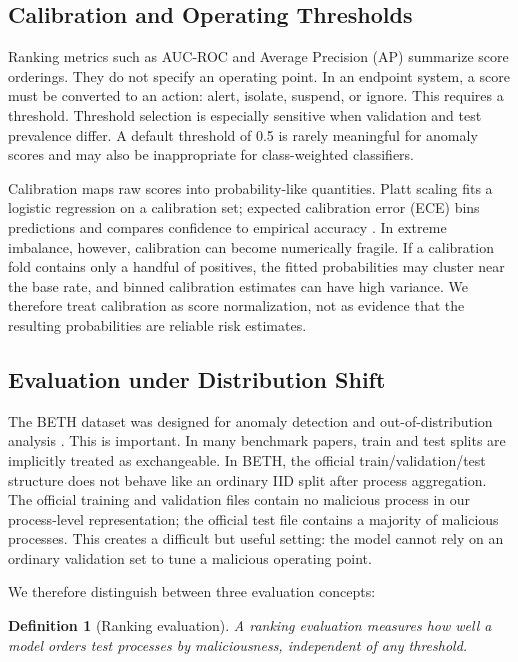 \documentclass[10pt,journal,compsoc]{IEEEtran}
\newtheorem{definition}{Definition}
\begin{document}
\subsection{Calibration and Operating Thresholds}

Ranking metrics such as AUC-ROC and Average Precision (AP) summarize score orderings. They do not specify an operating point. In an endpoint system, a score must be converted to an action: alert, isolate, suspend, or ignore. This requires a threshold. Threshold selection is especially sensitive when validation and test prevalence differ. A default threshold of 0.5 is rarely meaningful for anomaly scores and may also be inappropriate for class-weighted classifiers.

Calibration maps raw scores into probability-like quantities. Platt scaling \cite{platt1999} fits a logistic regression on a calibration set; expected calibration error (ECE) bins predictions and compares confidence to empirical accuracy \cite{guo2017}. In extreme imbalance, however, calibration can become numerically fragile. If a calibration fold contains only a handful of positives, the fitted probabilities may cluster near the base rate, and binned calibration estimates can have high variance. We therefore treat calibration as score normalization, not as evidence that the resulting probabilities are reliable risk estimates.

\subsection{Evaluation under Distribution Shift}

The BETH dataset was designed for anomaly detection and out-of-distribution analysis \cite{highnam2021}. This is important. In many benchmark papers, train and test splits are implicitly treated as exchangeable. In BETH, the official train/validation/test structure does not behave like an ordinary IID split after process aggregation. The official training and validation files contain no malicious process in our process-level representation; the official test file contains a majority of malicious processes. This creates a difficult but useful setting: the model cannot rely on an ordinary validation set to tune a malicious operating point.

We therefore distinguish between three evaluation concepts:
\begin{definition}[Ranking evaluation]
A ranking evaluation measures how well a model orders test processes by maliciousness, independent of any threshold.
\end{definition}
\end{document}
